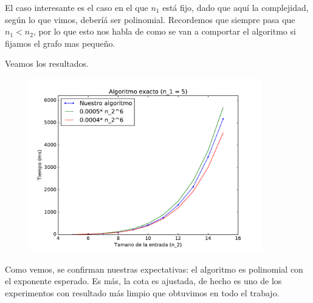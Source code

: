 El caso interesante es el caso en el que $n_1$ está fijo, dado que aquí la complejidad, según lo que vimos, deberíá ser polinomial. Recordemos que siempre pasa que $n_1 < n_2$, por lo que esto nos habla de como se van a comportar el algoritmo si fijamos el grafo mas pequeño.

Veamos los resultados.


\begin{figure}[H]
 \centering
	\includegraphics[width=0.9\textwidth]{graficos/problema_2/tiempos_2.pdf}
	\caption{}
	\label{fig:problema2-2}
\end{figure}

Como vemos, se confirman nuestras expectativas: el algoritmo es polinomial con el exponente esperado.
Es más, la cota es ajustada, de hecho es uno de los experimentos con resultado más limpio que obtuvimos en todo el trabajo.


